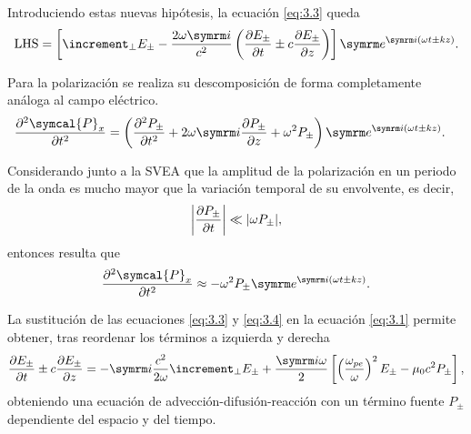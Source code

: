 Introduciendo estas nuevas hipótesis, la ecuación \eqref{eq:3.3} queda
\begin{equation}
  \mathrm{LHS} =
  \left[\laplacian_{\perp}E_{\pm } - \frac{2 \omega \iu }{c^{2}} \left(\pdv{E_{\pm }}{t} \pm c \pdv{E_{\pm }}{z}\right)\right]\eu^{\iu (\omega t \pm kz)}.
\end{equation}

Para la polarización se realiza su descomposición de forma completamente análoga al campo eléctrico.
\begin{align}
    \pdvN{\symcal{P}_{x}}{t}{2}
    &=
    \left(\pdvN{P_{\pm }}{t}{2} + 2 \omega \iu \pdv{P_{\pm }}{z} + \omega^{2}P_{\pm }\right)\eu^{\iu (\omega t \pm kz)}.
\end{align}

Considerando junto a la SVEA que la amplitud de la polarización en un periodo de la onda es mucho mayor que la variación temporal de su envolvente, es decir,
\begin{equation}
  \left|\frac{\partial P_{\pm }}{\partial t}\right| \ll |\omega P_{\pm }|,
\end{equation}
\noindent
entonces resulta que
\begin{equation}\label{eq:3.4}
  \pdvN{\symcal{P}_{x}}{t}{2} \approx -\omega^{2}P_{\pm }\eu^{\iu (\omega t \pm kz)}.
\end{equation}

La sustitución de las ecuaciones \eqref{eq:3.3} y \eqref{eq:3.4} en la ecuación \eqref{eq:3.1} permite obtener, tras reordenar los términos a izquierda y derecha
\begin{equation}
  \pdv{E_{\pm }}{t} \pm c \pdv{E_{\pm }}{z} = -\iu \frac{c^{2}}{2 \omega}\laplacian_{\perp}E_{\pm } + \frac{\iu \omega}{2} \left[\left(\frac{\omega_{pe}}{\omega}\right)^{2}E_{\pm } - \mu_{0}c^{2}P_{\pm }\right],
\end{equation}
\noindent
obteniendo una ecuación de advección-difusión-reacción con un término fuente $P_{\pm}$ dependiente del espacio y del tiempo. 

